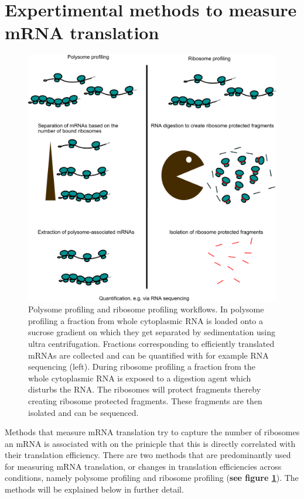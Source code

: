 \documentclass[
  12pt,
  openany]{book}
\begin{document}
\section{Expertimental methods to measure mRNA translation} \label{exptMethod}
\begin{figure}
    \includegraphics{./figures/polyRibo.pdf}
  \caption{Polysome profiling and ribosome profiling workflows. In polysome profiling a fraction from whole cytoplasmic RNA is loaded onto a sucrose gradient on which they get separated by sedimentation using ultra centrifugation. Fractions corresponding to efficiently translated mRNAs are collected and can be quantified with for example RNA sequencing (left). During ribosome profiling a fraction from the whole cytoplasmic RNA is exposed to a digestion agent which disturbs the RNA. The ribosomes will protect fragments thereby creating ribosome protected fragments. These fragments are then isolated and can be sequenced.  \label{fig:polyRibo}}
\end{figure}

Methods that measure mRNA translation try to capture the number of ribosomes an mRNA is associated with on the prinicple that this is directly correlated with their translation efficiency. There are two methods that are predominantly used for measuring mRNA translation, or changes in translation efficiencies across conditions, namely polysome profiling and ribosome profiling (\textbf{see figure \ref{fig:polyRibo}}). The methods will be explained below in further detail.
\end{document}
